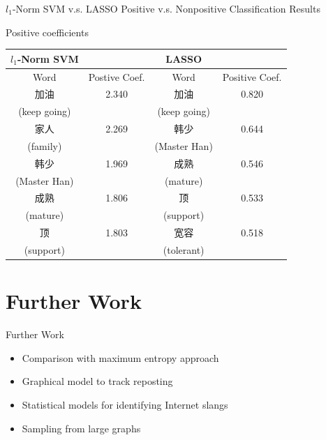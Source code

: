 \documentclass[12pt]{beamer}
\newcommand{\1}[1]{{\mathbf 1}\left\{#1\right\}}        %
\begin{document}
\begin{frame}{$l_1$-Norm SVM v.s. LASSO}
Positive v.s. Nonpositive Classification Results

Positive coefficients

\small
\begin{center}
\begin{tabular}{|c|c||c|c|}
\hline
$l_1$-Norm SVM & & LASSO &  \\ \hline
Word & Postive Coef. & Word & Positive Coef.\\ \hline\hline
加油 & 2.340 & 加油 & 0.820\\
(keep going) & & (keep going) &\\\hline
家人 & 2.269 & 韩少 & 0.644\\
(family) & & (Master Han) &  \\\hline
韩少 & 1.969 & 成熟 & 0.546\\
(Master Han) & & (mature) &  \\\hline
成熟 & 1.806 & 顶 & 0.533\\
(mature) & & (support) &  \\\hline
顶 & 1.803 & 宽容 & 0.518\\
(support) & & (tolerant) &  \\\hline
\end{tabular}
\end{center}





\end{frame}

\section{Further Work}

\begin{frame}{Further Work}

\begin{itemize}[<+->]
\item Comparison with maximum entropy approach
\item Graphical model to track reposting
\item Statistical models for identifying Internet slangs
\item Sampling from large graphs
\end{itemize}

\end{frame}
\end{document}
